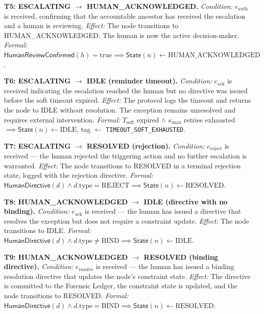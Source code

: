 \bigskip
\noindent\textbf{T5: ESCALATING $\rightarrow$ HUMAN\_ACKNOWLEDGED.} \emph{Condition:} $e_{\text{auth}}$ is received, confirming that the accountable ancestor has received the escalation and a human is reviewing. \emph{Effect:} The node transitions to HUMAN\_ACKNOWLEDGED. The human is now the active decision-maker. \emph{Formal:} $\mathsf{HumanReviewConfirmed}(h) = \text{true} \implies \mathsf{State}(n) \leftarrow \text{HUMAN\_ACKNOWLEDGED}$.

\bigskip
\noindent\textbf{T6: ESCALATING $\rightarrow$ IDLE (reminder timeout).} \emph{Condition:} $e_{\text{ack}}$ is received indicating the escalation reached the human but no directive was issued before the soft timeout expired. \emph{Effect:} The protocol logs the timeout and returns the node to IDLE without resolution. The exception remains unresolved and requires external intervention. \emph{Formal:} $T_{\text{soft}}$ expired $\land$ $\kappa_{\text{max}}$ retries exhausted $\implies \mathsf{State}(n) \leftarrow \text{IDLE}$, tag $\leftarrow$ \texttt{TIMEOUT\_SOFT\_EXHAUSTED}.

\bigskip
\noindent\textbf{T7: ESCALATING $\rightarrow$ RESOLVED (rejection).} \emph{Condition:} $e_{\text{reject}}$ is received — the human rejected the triggering action and no further escalation is warranted. \emph{Effect:} The node transitions to RESOLVED in a terminal rejection state, logged with the rejection directive. \emph{Formal:} $\mathsf{HumanDirective}(d) \land d.\text{type} = \text{REJECT} \implies \mathsf{State}(n) \leftarrow \text{RESOLVED}$.

\bigskip
\noindent\textbf{T8: HUMAN\_ACKNOWLEDGED $\rightarrow$ IDLE (directive with no binding).} \emph{Condition:} $e_{\text{ack}}$ is received — the human has issued a directive that resolves the exception but does not require a constraint update. \emph{Effect:} The node transitions to IDLE. \emph{Formal:} $\mathsf{HumanDirective}(d) \land d.\text{type} \neq \text{BIND} \implies \mathsf{State}(n) \leftarrow \text{IDLE}$.

\bigskip
\noindent\textbf{T9: HUMAN\_ACKNOWLEDGED $\rightarrow$ RESOLVED (binding directive).} \emph{Condition:} $e_{\text{resolve}}$ is received — the human has issued a binding resolution directive that updates the node's constraint state. \emph{Effect:} The directive is committed to the Forensic Ledger, the constraint state is updated, and the node transitions to RESOLVED. \emph{Formal:} $\mathsf{HumanDirective}(d) \land d.\text{type} = \text{BIND} \implies \mathsf{State}(n) \leftarrow \text{RESOLVED}$.

